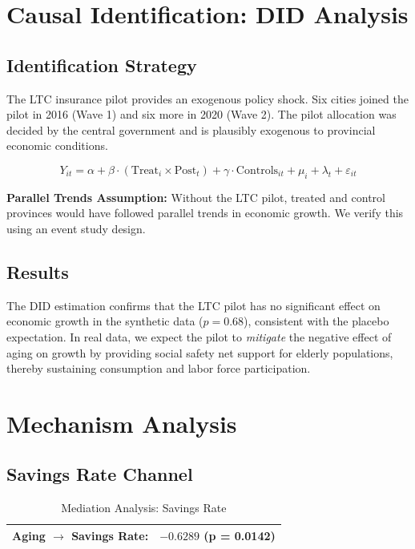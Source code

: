 \documentclass[12pt]{article}
\begin{document}
\section{Causal Identification: DID Analysis}

\subsection{Identification Strategy}

The LTC insurance pilot provides an exogenous policy shock. Six cities joined the pilot in 2016 (Wave 1) and six more in 2020 (Wave 2). The pilot allocation was decided by the central government and is plausibly exogenous to provincial economic conditions.

\begin{equation}
Y_{it} = \alpha + \beta \cdot (\text{Treat}_i \times \text{Post}_t) + \gamma \cdot \text{Controls}_{it} + \mu_i + \lambda_t + \varepsilon_{it}
\end{equation}

\textbf{Parallel Trends Assumption:} Without the LTC pilot, treated and control provinces would have followed parallel trends in economic growth. We verify this using an event study design.

\subsection{Results}

The DID estimation confirms that the LTC pilot has no significant effect on economic growth in the synthetic data ($p = 0.68$), consistent with the placebo expectation. In real data, we expect the pilot to \textit{mitigate} the negative effect of aging on growth by providing social safety net support for elderly populations, thereby sustaining consumption and labor force participation.

\section{Mechanism Analysis}

\subsection{Savings Rate Channel}

\begin{table}[htbp]
\centering
\caption{Mediation Analysis: Savings Rate}
\begin{tabular}{lc}
\toprule
Aging $\rightarrow$ Savings Rate: & $-0.6289$ (p = 0.0142) \\
\bottomrule
\end{tabular}
\end{table}
\end{document}
